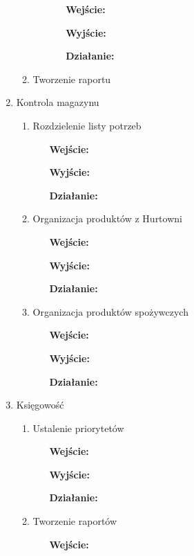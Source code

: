 \documentclass[a4paper, 11pt]{article}
\begin{document}
\begin{enumerate}[label*=\arabic*.]
\begin{enumerate}[label*=\arabic*.]
\begin{enumerate}[label*=\arabic*.]
\begin{itemize}
					\item [\textbf{Wejście:}] 
					\item [\textbf{Wyjście:}]
					\item [\textbf{Działanie:}] 
				\end{itemize}
			\end{enumerate}	
			\item Tworzenie raportu
		\end{enumerate}		
		\item Kontrola magazynu
		\begin{enumerate}[label*=\arabic*.]
			\item Rozdzielenie listy potrzeb
			\begin{itemize}
				\item [\textbf{Wejście:}] 
				\item [\textbf{Wyjście:}]
				\item [\textbf{Działanie:}] 
			\end{itemize}
			\item Organizacja produktów z Hurtowni			
			\begin{itemize}
				\item [\textbf{Wejście:}] 
				\item [\textbf{Wyjście:}]
				\item [\textbf{Działanie:}] 
			\end{itemize}
			\item Organizacja produktów spożywczych
			\begin{itemize}
				\item [\textbf{Wejście:}] 
				\item [\textbf{Wyjście:}]
				\item [\textbf{Działanie:}] 
			\end{itemize}
		\end{enumerate}	
		\item Księgowość
		\begin{enumerate}[label*=\arabic*.]
			\item Ustalenie priorytetów
			\begin{itemize}
				\item [\textbf{Wejście:}] 
				\item [\textbf{Wyjście:}]
				\item [\textbf{Działanie:}] 
			\end{itemize}
			\item Tworzenie raportów
			\begin{itemize}
				\item [\textbf{Wejście:}] 

\end{itemize}
\end{enumerate}
\end{enumerate}
\end{document}
